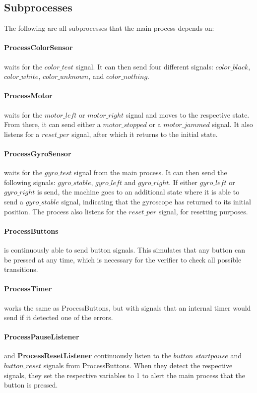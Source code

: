 \documentclass[a4paper,oneside,11pt]{article}
\begin{document}
\subsection{Subprocesses}
The following are all subprocesses that the main process depends on:

\paragraph{ProcessColorSensor} waits for the $color\_test$ signal. It can then send four different signals: $color\_black$, $color\_white$, $color\_unknown$, and $color\_nothing$.

\paragraph{ProcessMotor} waits for the $motor\_left$ or $motor\_right$ signal and moves to the respective state. From there, it can send either a $motor\_stopped$ or a $motor\_jammed$ signal. It also listens for a $reset\_per$ signal, after which it returns to the initial state.

\paragraph{ProcessGyroSensor} waits for the $gyro\_test$ signal from the main process. It can then send the following signals: $gyro\_stable$, $gyro\_left$ and $gyro\_right$. If either $gyro\_left$ or $gyro\_right$ is send, the machine goes to an additional state where it is able to send a $gyro\_stable$ signal, indicating that the gyroscope has returned to its initial position. The process also listens for the $reset\_per$ signal, for resetting purposes.

\paragraph{ProcessButtons} is continuously able to send button signals. This simulates that any button can be pressed at any time, which is necessary for the verifier to check all possible transitions. 

\paragraph{ProcessTimer} works the same as ProcessButtons, but with signals that an internal timer would send if it detected one of the errors.

\paragraph{ProcessPauseListener} and \textbf{ProcessResetListener} continuously listen to the $button\_startpause$ and $button\_reset$ signals from ProcessButtons. When they detect the respective signals, they set the respective variables to 1 to alert the main process that the button is pressed.
\end{document}
